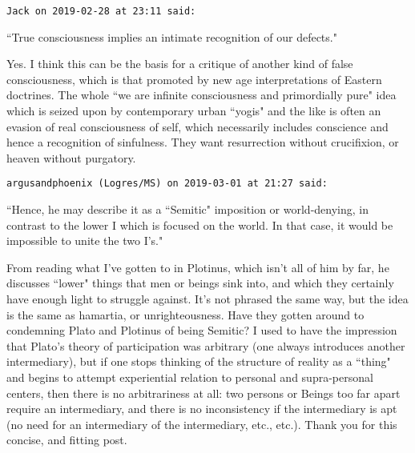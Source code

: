 \begin{footnotesize}\begin{sffamily}



\texttt{Jack on 2019-02-28 at 23:11 said: }

``True consciousness implies an intimate recognition of our defects."

Yes. I think this can be the basis for a critique of another kind of false consciousness, which is that promoted by new age interpretations of Eastern doctrines. The whole ``we are infinite consciousness and primordially pure" idea which is seized upon by contemporary urban ``yogis" and the like is often an evasion of real consciousness of self, which necessarily includes conscience and hence a recognition of sinfulness. They want resurrection without crucifixion, or heaven without purgatory.


\hfill

\texttt{argusandphoenix (Logres/MS) on 2019-03-01 at 21:27 said: }

``Hence, he may describe it as a ``Semitic" imposition or world-denying, in contrast to the lower I which is focused on the world. In that case, it would be impossible to unite the two I's." 

From reading what I've gotten to in Plotinus, which isn't all of him by far, he discusses ``lower" things that men or beings sink into, and which they certainly have enough light to struggle against. It's not phrased the same way, but the idea is the same as hamartia, or unrighteousness. Have they gotten around to condemning Plato and Plotinus of being Semitic? I used to have the impression that Plato's theory of participation was arbitrary (one always introduces another intermediary), but if one stops thinking of the structure of reality as a ``thing" and begins to attempt experiential relation to personal and supra-personal centers, then there is no arbitrariness at all: two persons or Beings too far apart require an intermediary, and there is no inconsistency if the intermediary is apt (no need for an intermediary of the intermediary, etc., etc.). Thank you for this concise, and fitting post.


\hfill


\end{sffamily}\end{footnotesize}

